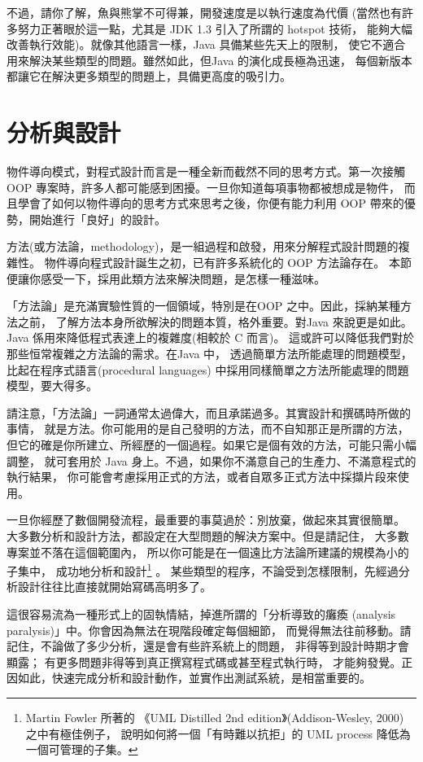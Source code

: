 不過，請你了解，魚與熊掌不可得兼，開發速度是以執行速度為代價
(當然也有許多努力正著眼於這一點，尤其是 JDK 1.3 引入了所謂的 hotspot 技術，
能夠大幅改善執行效能)。就像其他語言一樣，Java 具備某些先天上的限制，
使它不適合用來解決某些類型的問題。雖然如此，但Java 的演化成長極為迅速，
每個新版本都讓它在解決更多類型的問題上，具備更高度的吸引力。
\section{分析與設計}

物件導向模式，對程式設計而言是一種全新而截然不同的思考方式。第一次接觸
OOP 專案時，許多人都可能感到困擾。一旦你知道每項事物都被想成是物件，
而且學會了如何以物件導向的思考方式來思考之後，你便有能力利用
OOP 帶來的優勢，開始進行「良好」的設計。

方法(或方法論，methodology)，是一組過程和啟發，用來分解程式設計問題的複雜性。
物件導向程式設計誕生之初，已有許多系統化的 OOP 方法論存在。
本節便讓你感受一下，採用此類方法來解決問題，是怎樣一種滋味。

「方法論」是充滿實驗性質的一個領域，特別是在OOP 之中。因此，採納某種方法之前，
了解方法本身所欲解決的問題本質，格外重要。對Java 來說更是如此。
Java 係用來降低程式表達上的複雜度(相較於 C 而言)。
這或許可以降低我們對於那些恒常複雜之方法論的需求。在Java 中，
透過簡單方法所能處理的問題模型，比起在程序式語言(procedural languages)
中採用同樣簡單之方法所能處理的問題模型，要大得多。

請注意，「方法論」一詞通常太過偉大，而且承諾過多。其實設計和撰碼時所做的事情，
就是方法。你可能用的是自己發明的方法，而不自知那正是所謂的方法，
但它的確是你所建立、所經歷的一個過程。如果它是個有效的方法，可能只需小幅調整，
就可套用於 Java 身上。不過，如果你不滿意自己的生產力、不滿意程式的執行結果，
你可能會考慮採用正式的方法，或者自眾多正式方法中採擷片段來使用。

一旦你經歷了數個開發流程，最重要的事莫過於：別放棄，做起來其實很簡單。
大多數分析和設計方法，都設定在大型問題的解決方案中。但是請記住，
大多數專案並不落在這個範圍內，
所以你可能是在一個遠比方法論所建議的規模為小的子集中，
成功地分析和設計\footnote{Martin Fowler 所著的
《UML Distilled 2nd edition》(Addison-Wesley, 2000) 之中有極佳例子，
說明如何將一個「有時難以抗拒」的 UML process 降低為一個可管理的子集。} 。
某些類型的程序，不論受到怎樣限制，先經過分析設計往往比直接就開始寫碼高明多了。

這很容易流為一種形式上的固執情結，掉進所謂的「分析導致的癱瘓
(analysis paralysis)」中。你會因為無法在現階段確定每個細節，
而覺得無法往前移動。請記住，不論做了多少分析，還是會有些許系統上的問題，
非得等到設計時期才會顯露；
有更多問題非得等到真正撰寫程式碼或甚至程式執行時，
才能夠發覺。正因如此，快速完成分析和設計動作，並實作出測試系統，是相當重要的。

